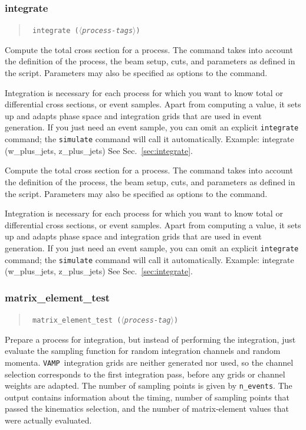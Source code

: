 \documentclass[12pt]{book}
\newenvironment{code}%
  {\begingroup\footnotesize
   \quote
   \verbatim}%
  {\endverbatim
   \endquote
   \endgroup\noindent}
\newenvironment{syntax}%
  {\begin{quote}
   \begin{flushleft}\tt}%
  {\end{flushleft}
   \end{quote}}
\newcommand{\var}[1]{$\langle$\textit{#1}$\rangle$}
\newcommand{\ttt}[1]{\texttt{#1}}
\newcommand{\vamp}{\texttt{VAMP}}
\begin{document}
\subsubsection{integrate}
\begin{syntax}
integrate (\var{process-tags})
\end{syntax}
Compute the total cross section for a process.  The command takes into account
the definition of the process, the beam setup, cuts, and parameters as defined
in the script.  Parameters may also be specified as options to the command.

Integration is necessary for each process for which you want to know total or
differential cross sections, or event samples.  Apart from computing a value,
it sets up and adapts phase space and integration grids that are used in event
generation.   If you just need an event sample, you can omit an explicit
\ttt{integrate} command; the \ttt{simulate} command will call it
automatically.  Example:
\begin{code}
integrate (w_plus_jets, z_plus_jets)
\end{code}
See Sec.~\ref{sec:integrate}.

Compute the total cross section for a process.  The command takes into account
the definition of the process, the beam setup, cuts, and parameters as defined
in the script.  Parameters may also be specified as options to the command.

Integration is necessary for each process for which you want to know total or
differential cross sections, or event samples.  Apart from computing a value,
it sets up and adapts phase space and integration grids that are used in event
generation.   If you just need an event sample, you can omit an explicit
\ttt{integrate} command; the \ttt{simulate} command will call it
automatically.  Example:
\begin{code}
integrate (w_plus_jets, z_plus_jets)
\end{code}
See Sec.~\ref{sec:integrate}.


\subsubsection{matrix\_element\_test}
\begin{syntax}
matrix\_element\_test (\var{process-tag})
\end{syntax}
Prepare a process for integration, but instead of performing the
integration, just evaluate the sampling function for random
integration channels and random momenta.  \vamp\ integration grids are
neither generated nor used, so the channel selection corresponds to
the first integration pass, before any grids or channel weights are
adapted.  The number of sampling points is given by \verb|n_events|.
The output contains information about the timing, number of sampling
points that passed the kinematics selection, and the number of
matrix-element values that were actually evaluated.
\end{document}
